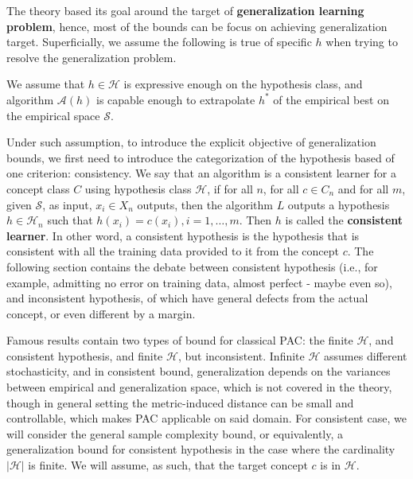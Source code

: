 The theory based its goal around the target of \textbf{generalization learning problem}, hence, most of the bounds can be focus on achieving generalization target. Superficially, we assume the following is true of specific $h$ when trying to resolve the generalization problem. 
\begin{assumption}
    We assume that $h\in\mathcal{H}$ is expressive enough on the hypothesis class, and algorithm $\mathcal{A}(h)$ is capable enough to extrapolate $h^{*}$ of the empirical best on the empirical space $\mathcal{S}$.
\end{assumption}
Under such assumption, to introduce the explicit objective of generalization bounds, we first need to introduce the categorization of the hypothesis based of one criterion: consistency. We say that an algorithm is a consistent learner for a concept class $C$ using hypothesis class $\mathcal{H}$, if for all $n$, for all $c\in C_n$ and for all $m$, given $\mathcal{S}$, as input, $x_i \in X_n$ outputs, then the algorithm $L$ outputs a hypothesis $h\in \mathcal{H}_n$ such that $h(x_i) = c(x_i) , i = 1,\dots,m$. Then $h$ is called the \textbf{consistent learner}. In other word, a consistent hypothesis is the hypothesis that is consistent with all the training data provided to it from the concept $c$. The following section contains the debate between consistent hypothesis (i.e., for example, admitting no error on training data, almost perfect - maybe even so), and inconsistent hypothesis, of which have general defects from the actual concept, or even different by a margin.  

Famous results contain two types of bound for classical PAC: the finite $\mathcal{H}$, and consistent hypothesis, and finite $\mathcal{H}$, but inconsistent. Infinite $\mathcal{H}$ assumes different stochasticity, and in consistent bound, generalization depends on the variances between empirical and generalization space, which is not covered in the theory, though in general setting the metric-induced distance can be small and controllable, which makes PAC applicable on said domain. For consistent case, we will consider the general sample complexity bound, or equivalently, a generalization bound for consistent hypothesis in the case where the cardinality $|\mathcal{H}|$ is finite. We will assume, as such, that the target concept $c$ is in $\mathcal{H}$. 


